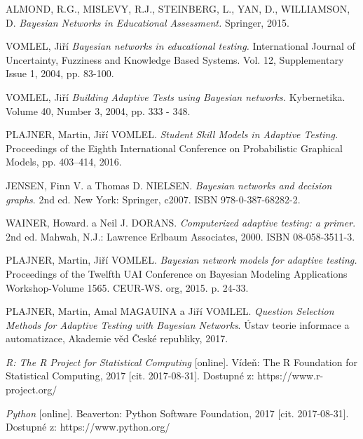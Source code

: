 \documentclass[a4paper,twoside,12pt]{scrbook}
\begin{document}
\begin{thebibliography}{99}
	 ALMOND, R.G., MISLEVY, R.J., STEINBERG, L., YAN, D., WILLIAMSON, D. \textit{Bayesian Networks in Educational Assessment.} Springer, 2015.

	 VOMLEL, Jiří \textit{Bayesian networks in educational testing.} International Journal of Uncertainty, Fuzziness and Knowledge Based Systems. Vol. 12, Supplementary Issue 1, 2004, pp. 83-100.

	 VOMLEL, Jiří \textit{Building Adaptive Tests using Bayesian networks.} Kybernetika. Volume 40, Number 3, 2004, pp. 333 - 348.

	 PLAJNER, Martin, Jiří VOMLEL. \textit{Student Skill Models in Adaptive Testing.} Proceedings of the Eighth International Conference on Probabilistic Graphical Models, pp. 403–414, 2016.


	 JENSEN, Finn V. a Thomas D. NIELSEN. \textit{Bayesian networks and decision graphs}. 2nd ed. New York: Springer, c2007. ISBN 978-0-387-68282-2.

	 WAINER, Howard. a Neil J. DORANS. \textit{Computerized adaptive testing: a primer}. 2nd ed. Mahwah, N.J.: Lawrence Erlbaum Associates, 2000. ISBN 08-058-3511-3.

	 PLAJNER, Martin, Jiří VOMLEL. \textit{Bayesian network models for adaptive testing.} Proceedings of the Twelfth UAI Conference on Bayesian Modeling Applications Workshop-Volume 1565. CEUR-WS. org, 2015. p. 24-33.

	 PLAJNER, Martin, Amal MAGAUINA a Jiří VOMLEL. \textit{Question Selection Methods for Adaptive Testing with Bayesian Networks}. Ústav teorie informace a automatizace, Akademie věd České republiky, 2017.


	 \textit{R: The R Project for Statistical Computing} [online]. Vídeň: The R Foundation for Statistical Computing, 2017 [cit. 2017-08-31]. Dostupné z: https://www.r-project.org/

	 \textit{Python} [online]. Beaverton: Python Software Foundation, 2017 [cit. 2017-08-31]. Dostupné z: https://www.python.org/


\end{thebibliography}
\end{document}
